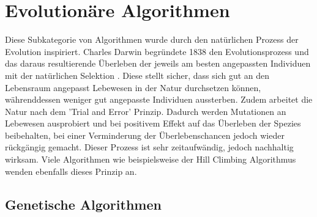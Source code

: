 \chapter{Evolutionäre Algorithmen}

Diese Subkategorie von Algorithmen wurde durch den natürlichen Prozess der Evolution
inspiriert. Charles Darwin begründete 1838 den Evolutionsprozess und das daraus resultierende
Überleben der jeweils am besten angepassten Individuen mit der natürlichen Selektion \cite{Wiki02}.
Diese stellt sicher, dass sich gut an den Lebensraum angepasst Lebewesen in der Natur
durchsetzen können, währenddessen weniger gut angepasste Individuen aussterben. Zudem
arbeitet die Natur nach dem 'Trial and Error' Prinzip. Dadurch werden Mutationen an
Lebewesen ausprobiert und bei positivem Effekt auf das Überleben der Spezies beibehalten,
bei einer Verminderung der Überlebenschancen jedoch wieder rückgängig gemacht. Dieser Prozess
ist sehr zeitaufwändig, jedoch nachhaltig wirksam. Viele Algorithmen wie beispielsweise
der Hill Climbing Algorithmus \cite{Anr18} wenden ebenfalls dieses Prinzip an.

\section{Genetische Algorithmen}

